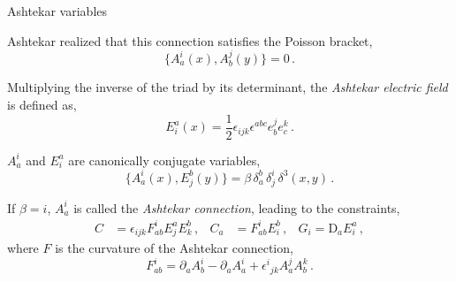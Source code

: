 \documentclass[12pt,titlepage]{article}
\begin{document}
\begin{frame}{Ashtekar variables}
    \begin{list}{\,}{\leftmargin=1em \itemindent=0em}
        \item<1-> Ashtekar realized that this connection satisfies the Poisson bracket,
        \begin{equation}
            \{A_a^i(x),A_b^j(y)\}=0\,.
        \end{equation}
        \item<2-> Multiplying the inverse of the triad by its determinant, the \textit{Ashtekar electric field} is defined as,
        \begin{equation}
            E^a_i(x)=\frac{1}{2}\epsilon_{ijk}\epsilon^{abc} e_b^j e_c^k\,.
        \end{equation}
        \item<3-> $A_a^i$ and $E^a_i$ are canonically conjugate variables,
        \begin{equation}
            \{A_a^i(x),E^b_j(y)\}=\beta\,\delta_a^b\,\delta_j^i\,\delta^3(x,y)\,.
        \end{equation}
        \item<4-> If $\beta=i$, $A_a^i$ is called the \textit{Ashtekar connection}, leading to the constraints,
        \begin{align}
            C&=\epsilon_{ijk}F^i_{ab}E^{a}_j E^{b}_k\,, & C_a&=F^i_{ab}E^{b}_i\,, & G_i=\text{D}_{a}E^a_i\,,
        \end{align}
        where $F$ is the curvature of the Ashtekar connection,
        \begin{equation}
            F^i_{ab}=\partial_a A_b^i - \partial_a A_a^i + {\epsilon^i}_{jk} A_a^j A_b^k\,.
        \end{equation}
    \end{list}
\end{frame}
\end{document}

